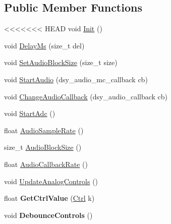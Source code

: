 \subsection*{Public Member Functions}
\begin{DoxyCompactItemize}
\item 
<<<<<<< HEAD
void \hyperlink{classdaisy_1_1_daisy_patch_a2c7ab184dfc412238675046969cbbd17}{Init} ()
\item 
void \hyperlink{classdaisy_1_1_daisy_patch_ad1d37ebfcfe6e45f7a4e334ea8409c5a}{Delay\+Ms} (size\+\_\+t del)
\item 
void \hyperlink{classdaisy_1_1_daisy_patch_a3eb9d0267312bbe4997124afc9d75b89}{Set\+Audio\+Block\+Size} (size\+\_\+t size)
\item 
void \hyperlink{classdaisy_1_1_daisy_patch_a0187184a92724b936d7e7307565ade32}{Start\+Audio} (dsy\+\_\+audio\+\_\+mc\+\_\+callback cb)
\item 
void \hyperlink{classdaisy_1_1_daisy_patch_a3596104d2f27dfdb5c5fa3852433d4f9}{Change\+Audio\+Callback} (dsy\+\_\+audio\+\_\+callback cb)
\item 
void \hyperlink{classdaisy_1_1_daisy_patch_aef89b7d3492d87652af2207f315e6c6d}{Start\+Adc} ()
\item 
float \hyperlink{classdaisy_1_1_daisy_patch_a37a674649bef92a97207ed7fbc4f1b80}{Audio\+Sample\+Rate} ()
\item 
size\+\_\+t \hyperlink{classdaisy_1_1_daisy_patch_aae8865391971e0ad736ff48543ecf234}{Audio\+Block\+Size} ()
\item 
float \hyperlink{classdaisy_1_1_daisy_patch_a52112189562e5160b0d7e7157bbbac8a}{Audio\+Callback\+Rate} ()
\item 
void \hyperlink{classdaisy_1_1_daisy_patch_ae2ad525616e3ae3a336e8cff2fec9ab0}{Update\+Analog\+Controls} ()
\item 
\mbox{\label{classdaisy_1_1_daisy_patch_ae5a66e6d84d61ab81aa821e3c46e10c4}} 
float {\bfseries Get\+Ctrl\+Value} (\hyperlink{classdaisy_1_1_daisy_patch_aefa3638dd587fe20c48bbdfba3cd72b3}{Ctrl} k)
\item 
\mbox{\label{classdaisy_1_1_daisy_patch_a046a2f43d0ac7faa527707f2c7b7df07}} 
void {\bfseries Debounce\+Controls} ()
\item 
\mbox{\label{classdaisy_1_1_daisy_patch_a92c7dc12ffda2fff994a19935cd251e1}} 

\end{DoxyCompactItemize}
